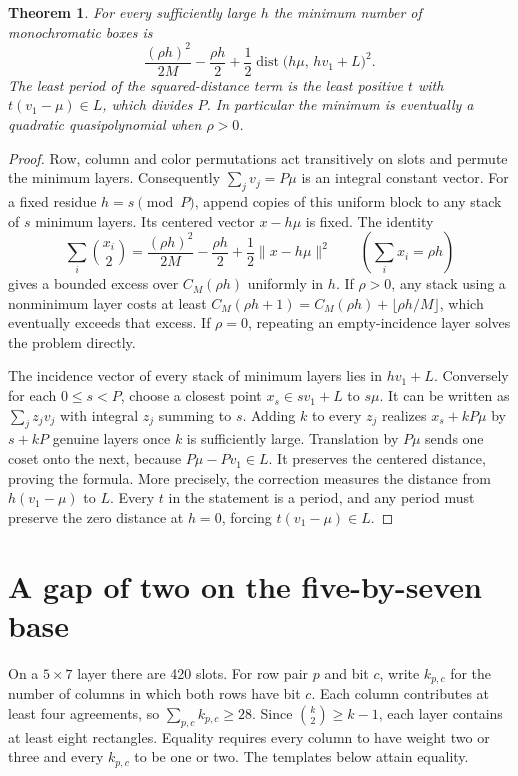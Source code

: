 \documentclass[11pt]{article}
\newtheorem{theorem}{Theorem}
\begin{document}
\begin{theorem}\label{t:lattice}
For every sufficiently large $h$ the minimum number of monochromatic boxes is
\[
 \frac{(\rho h)^2}{2M}-\frac{\rho h}{2}
 +\frac12\operatorname{dist}\bigl(h\mu,\,hv_1+L\bigr)^2 .
\]
The least period of the squared-distance term is the least positive $t$ with $t(v_1-\mu)\in L$, which divides $P$. In particular the minimum is eventually a quadratic quasipolynomial when $\rho>0$.
\end{theorem}
\begin{proof}
Row, column and color permutations act transitively on slots and permute the minimum layers. Consequently $\sum_jv_j=P\mu$ is an integral constant vector. For a fixed residue $h=s\pmod P$, append copies of this uniform block to any stack of $s$ minimum layers. Its centered vector $x-h\mu$ is fixed. The identity
\[
 \sum_i \binom{x_i}{2}
 =\frac{(\rho h)^2}{2M}-\frac{\rho h}{2}
       +\frac12\lVert x-h\mu\rVert^2 \qquad(\textstyle\sum_i x_i=\rho h)
\]
gives a bounded excess over $C_M(\rho h)$ uniformly in $h$. If $\rho>0$, any stack using a nonminimum layer costs at least $C_M(\rho h+1)=C_M(\rho h)+\lfloor\rho h/M\rfloor$, which eventually exceeds that excess. If $\rho=0$, repeating an empty-incidence layer solves the problem directly.

The incidence vector of every stack of minimum layers lies in $hv_1+L$. Conversely for each $0\le s<P$, choose a closest point $x_s\in sv_1+L$ to $s\mu$. It can be written as $\sum_j z_jv_j$ with integral $z_j$ summing to $s$. Adding $k$ to every $z_j$ realizes $x_s+kP\mu$ by $s+kP$ genuine layers once $k$ is sufficiently large. Translation by $P\mu$ sends one coset onto the next, because $P\mu-Pv_1\in L$. It preserves the centered distance, proving the formula. More precisely, the correction measures the distance from $h(v_1-\mu)$ to $L$. Every $t$ in the statement is a period, and any period must preserve the zero distance at $h=0$, forcing $t(v_1-\mu)\in L$.
\end{proof}

\section{A gap of two on the five-by-seven base}\label{s:base57}
On a $5\times7$ layer there are 420 slots. For row pair $p$ and bit $c$, write $k_{p,c}$ for the number of columns in which both rows have bit $c$. Each column contributes at least four agreements, so $\sum_{p,c}k_{p,c}\ge28$. Since $\binom k2\ge k-1$, each layer contains at least eight rectangles. Equality requires every column to have weight two or three and every $k_{p,c}$ to be one or two. The templates below attain equality.
\end{document}
